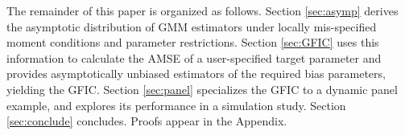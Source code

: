 The remainder of this paper is organized as follows. Section \ref{sec:asymp} derives the asymptotic distribution of GMM estimators under locally mis-specified moment conditions and parameter restrictions. 
Section \ref{sec:GFIC}  uses this information to calculate the AMSE of a user-specified target parameter and provides asymptotically unbiased estimators of the required bias parameters, yielding the GFIC. 
Section \ref{sec:panel} specializes the GFIC to a dynamic panel example, and explores its performance in a simulation study. 
Section \ref{sec:conclude} concludes. Proofs appear in the Appendix.

